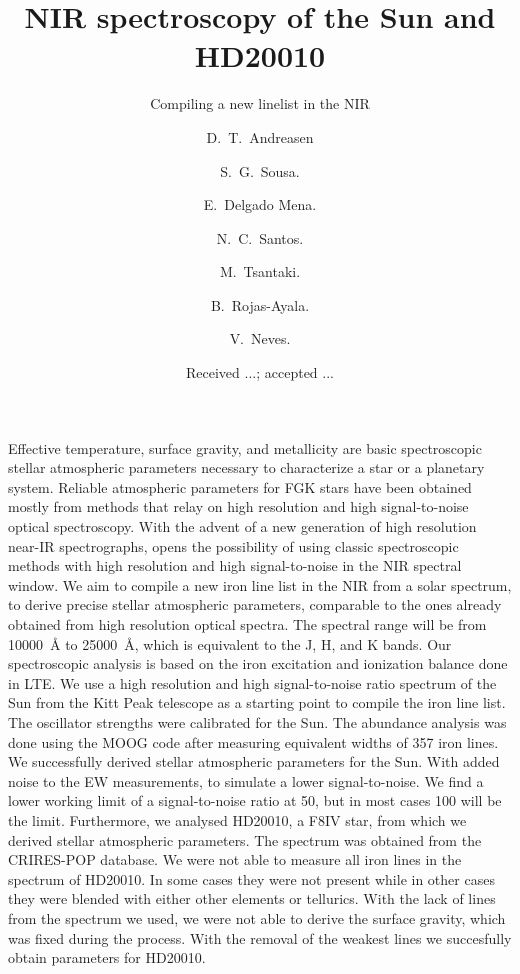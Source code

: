 \documentclass{aa}
\begin{document}
\title{NIR spectroscopy of the Sun and HD20010}
\subtitle{Compiling a new linelist in the NIR}


\author{ D.~T.~Andreasen
    \and S.~G.~Sousa.
    \and E.~Delgado Mena.
    \and N.~C.~Santos.
    \and M.~Tsantaki.
    \and B.~Rojas-Ayala.
    \and V.~Neves.}







\date{Received ...; accepted ...}

\abstract
{Effective temperature, surface gravity, and metallicity are basic
spectroscopic stellar atmospheric parameters necessary to characterize
a star or a planetary system. Reliable atmospheric parameters for
FGK stars have been obtained mostly from methods that relay on high
resolution and high signal-to-noise optical spectroscopy. With the
advent of a new generation of high resolution near-IR spectrographs,
opens the possibility of using classic spectroscopic methods with
high resolution and high signal-to-noise in the NIR spectral window.}
{We aim to compile a new iron line list in the NIR from a solar
spectrum, to derive precise stellar atmospheric parameters,
comparable to the ones already obtained from high resolution optical
spectra. The spectral range will be from \SI{10000}{\angstrom} to
\SI{25000}{\angstrom}, which is equivalent to the J, H, and K bands.}
{Our spectroscopic analysis is based on the iron excitation and
ionization balance done in LTE. We
use a high resolution and high signal-to-noise ratio spectrum of the Sun
from the Kitt Peak telescope as a starting point to compile the iron
line list. The oscillator strengths were calibrated for the Sun.
The abundance analysis was done using
the MOOG code after measuring equivalent widths of 357 iron lines. }
{We successfully derived stellar atmospheric parameters for the
Sun. With added noise to the EW measurements, to simulate a lower
signal-to-noise. We find a lower working limit of a signal-to-noise ratio
at 50, but in most cases 100 will be the limit.
Furthermore, we analysed
HD20010, a F8IV star, from which we derived stellar atmospheric
parameters. The spectrum was obtained from the CRIRES-POP database. We
were not able to measure all iron lines in the spectrum of HD20010. In
some cases they were not present while in other cases they were blended
with either other elements or tellurics. With the lack of 
lines from the spectrum we used, we were not able to derive the surface
gravity, which was fixed during the process. With the removal of the weakest
lines we succesfully obtain parameters for HD20010.}
{}
\end{document}
